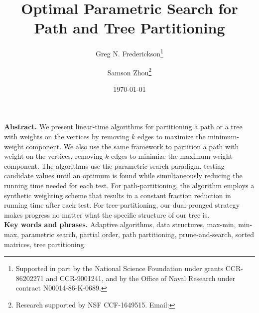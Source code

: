 \pagestyle{empty}
\title{Optimal Parametric Search for Path and Tree Partitioning}

\author{Greg N. Frederickson\thanks{Supported in part by the National Science Foundation under
grants CCR-86202271 and CCR-9001241,
and by the Office of Naval Research under contract
N00014-86-K-0689.} \\
\and Samson Zhou\thanks{Research supported by NSF CCF-1649515.
Email: 
}}
\date{\today}
\dspace
\maketitle
\pagestyle{plain}
\noindent
{\bf Abstract.}
We present linear-time algorithms for partitioning a path or a tree with weights on the vertices by removing $k$ edges to maximize the minimum-weight component. We also use the same framework to partition a path with weight on the vertices, removing $k$ edges to minimize the  maximum-weight component. The algorithms use the parametric search paradigm, testing candidate values until an optimum is found while simultaneously reducing the running time needed for each test.
For path-partitioning, the algorithm employs a synthetic weighting scheme that results in a constant fraction reduction in running time after each test. 
For tree-partitioning, our dual-pronged strategy makes progress no matter what the specific structure of our tree is.
\vspace{.2in}\\
{\bf Key words and phrases.}
Adaptive algorithms, 
data structures,
max-min,
min-max,
parametric search,
partial order,
path partitioning,
prune-and-search,
sorted matrices,
tree partitioning.
\newpage
{}
\dspace


